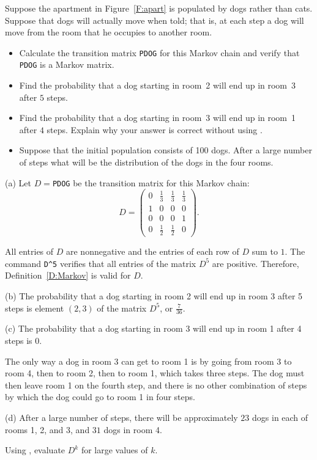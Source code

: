 \documentclass{ximera}
\begin{document}
\begin{computerExercise} \label{c4.10.5}
Suppose the apartment in Figure~\ref{F:apart} is populated by dogs rather than
cats.  Suppose that dogs will actually move when told; that is, at each step
a dog will move from the room that he occupies to another room.
\begin{itemize}
\item[(a)]  Calculate the transition matrix {\tt PDOG} for this Markov chain
and verify that {\tt PDOG} is a Markov matrix.
\item[(b)]  Find the probability that a dog starting in room~2 will end up in
room~3 after $5$ steps.
\item[(c)]  Find the probability that a dog starting in room~3 will end up in
room~1 after $4$ steps.  Explain why your answer is correct without using
\Matlabp.
\item[(d)]  Suppose that the initial population consists of 100 dogs.  After
a large number of steps what will be the distribution of the dogs in the four
rooms.
\end{itemize}

\begin{solution}

(a) \ans Let $D =${\tt PDOG} be the transition matrix for this Markov chain:
\[
D = \left(\begin{array}{rrrr} 0 & \frac{1}{3} & \frac{1}{3} &
\frac{1}{3} \\ 1 & 0 & 0 & 0 \\ 0 & 0 & 0 & 1 \\
0 & \frac{1}{2} & \frac{1}{2} & 0 \end{array}\right).
\]

\soln All entries of $D$ are nonnegative and the entries of each row of
$D$ sum to $1$.  The \Matlab command {\tt D\^{}5} verifies that all
entries of the matrix $D^5$ are positive.  Therefore,
Definition~\ref{D:Markov} is valid for $D$.

(b) The probability that a dog starting in room 2 will end up in room
3 after 5 steps is element $(2,3)$ of the matrix $D^5$, or
$\frac{7}{36}$.

(c) \ans The probability that a dog starting in room 3 will end up in room
1 after 4 steps is 0.

\soln The only way a dog in room 3 can get to room 1
is by going from room 3 to room 4, then to room 2, then to room 1, which
takes three steps.  The dog must then leave room 1 on the fourth step,
and there is no other combination of steps by which the dog could go to
room 1 in four steps.

(d) \ans After a large number of steps, there will be approximately $23$
dogs in each of rooms 1, 2, and 3, and $31$ dogs in room 4.

\soln Using \Matlab, evaluate $D^k$ for large values of $k$.

\end{solution}
\end{computerExercise}
\end{document}
